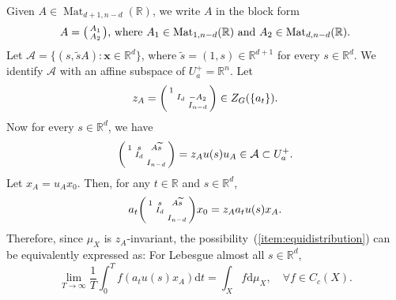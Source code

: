 \documentclass[12pt,reqno]{amsart}
\numberwithin{equation}{section}
\theoremstyle{plain}
\theoremstyle{definition}
\theoremstyle{remark}
\newcommand\bfx{\mathbf{x}}
\newcommand\cA{\mathcal{A}}
\newcommand{\R}{\mathbb{R}}
\newcommand{\de}{\mathrm{d}}
\DeclareMathOperator{\Mat}{Mat}
\begin{document}
    Given $A\in\Mat_{d+1,n-d}(\R)$, we write $A$ in the block form
	\[
	A=\begin{psmallmatrix}
	A_1 \\
	A_2
	\end{psmallmatrix} \text{, where $A_1\in\operatorname{Mat}_{1,n-d}(\R)$ and $A_2\in\operatorname{Mat}_{d,n-d}(\R)$.}
	\]
	 Let
    $\mathcal{A}=\{(s,\tilde sA)\colon \bfx\in\R^d\}$, where $\tilde s=(1,s)\in\R^{d+1}$ for every $s\in\R^d$.
    We identify $\cA$ with an affine subspace of $U_a^+=\R^n$.  Let
	\begin{equation} \label{eq:z_A}
	z_A=\begin{psmallmatrix}
	1   &    &       \\
	    & I_d & -A_2 \\
	    &     & I_{n-d}
	\end{psmallmatrix}\in Z_G(\{a_t\}).
	\end{equation}
    Now for every $s\in\R^d$, we have 
	\begin{equation*} 
	\begin{psmallmatrix} 1&s&A\widetilde{s}\\&I_d\\&&I_{n-d}\end{psmallmatrix}= z_Au(s)u_A\in\cA\subset U_a^+.
    \end{equation*}
    Let  $x_A=u_Ax_0$. Then, for any $t\in\R$ and $s\in\R^d$,
    \begin{equation} \label{eq:basic identity}
    a_t\begin{psmallmatrix} 1&s&A\widetilde{s}\\&I_d\\&&I_{n-d}\end{psmallmatrix}x_0=z_Aa_tu(s)x_A.
	\end{equation}
Therefore, since $\mu_X$ is $z_A$-invariant, the possibility~(\ref{item:equidistribution}) can be equivalently expressed as: For Lebesgue almost all $s\in\R^d$,
\begin{equation}
    \label{eq:equidistribution}
    \lim_{T\to\infty}\frac{1}{T}\int_{0}^{T}f(a_tu(s)x_A)\de t =
			\int_{X} f \de\mu_{X},\quad\forall f\in C_c(X).
\end{equation}
\end{document}
